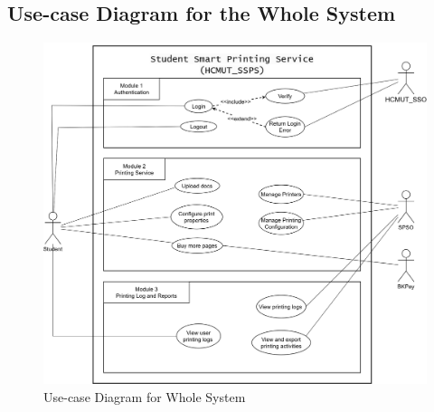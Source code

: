 \subsection{Use-case Diagram for the Whole System}
\begin{figure}[H]
    \centering
    \includegraphics[width=\textwidth]{images/usecase_diagram/use_case_whole_system.png}
    \caption{Use-case Diagram for Whole System}
    \label{fig:use_case_whole_system}
\end{figure}

